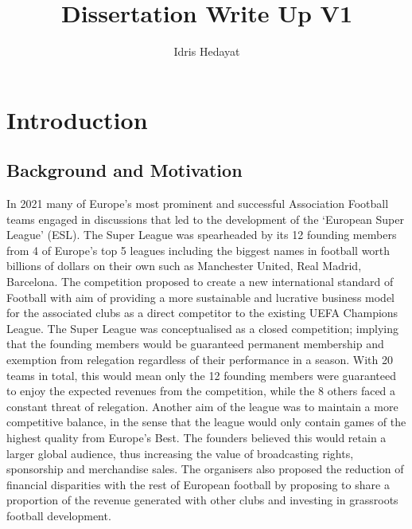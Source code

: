 \documentclass[
]{article}
\title{Dissertation Write Up V1}
\author{Idris Hedayat}
\date{}
\begin{document}
\maketitle

{
\setcounter{tocdepth}{2}
\tableofcontents
}
\hypertarget{introduction}{%
\section{Introduction}\label{introduction}}

\hypertarget{background-and-motivation}{%
\subsection{Background and Motivation}\label{background-and-motivation}}

In 2021 many of Europe's most prominent and successful Association
Football teams engaged in discussions that led to the development of the
`European Super League' (ESL). The Super League was spearheaded by its
12 founding members from 4 of Europe's top 5 leagues including the
biggest names in football worth billions of dollars on their own such as
Manchester United, Real Madrid, Barcelona. The competition proposed to
create a new international standard of Football with aim of providing a
more sustainable and lucrative business model for the associated clubs
as a direct competitor to the existing UEFA Champions League. The Super
League was conceptualised as a closed competition; implying that the
founding members would be guaranteed permanent membership and exemption
from relegation regardless of their performance in a season. With 20
teams in total, this would mean only the 12 founding members were
guaranteed to enjoy the expected revenues from the competition, while
the 8 others faced a constant threat of relegation. Another aim of the
league was to maintain a more competitive balance, in the sense that the
league would only contain games of the highest quality from Europe's
Best. The founders believed this would retain a larger global audience,
thus increasing the value of broadcasting rights, sponsorship and
merchandise sales. The organisers also proposed the reduction of
financial disparities with the rest of European football by proposing to
share a proportion of the revenue generated with other clubs and
investing in grassroots football development.
\end{document}
